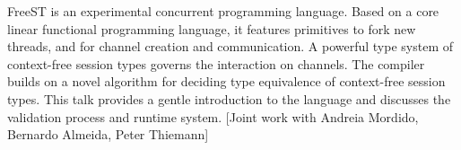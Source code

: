 FreeST is an experimental concurrent programming language. Based on a core linear functional programming language, it features primitives to fork new threads, and for channel creation and communication. A powerful type system of context-free session types governs the interaction on channels. The compiler builds on a novel algorithm for deciding type equivalence of context-free session types. This talk provides a gentle introduction to the language and discusses the validation process and runtime system. [Joint work with Andreia Mordido, Bernardo Almeida, Peter Thiemann]
